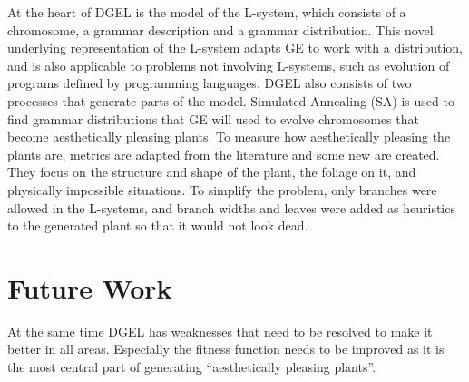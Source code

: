 At the heart of DGEL is the model of the L-system, which consists of a chromosome, a grammar description and a grammar distribution.
This novel underlying representation of the L-system adapts GE to work with a distribution, and is also applicable to problems not involving L-systems, such as evolution of programs defined by programming languages.
DGEL also consists of two processes that generate parts of the model.
Simulated Annealing (SA) is used to find grammar distributions that GE will used to evolve chromosomes that become aesthetically pleasing plants.
To measure how aesthetically pleasing the plants are, metrics are adapted from the literature and some new are created.
They focus on the structure and shape of the plant, the foliage on it, and physically impossible situations.
To simplify the problem, only branches were allowed in the L-systems, and branch widths and leaves were added as heuristics to the generated plant so that it would not look dead.


\section{Future Work}
At the same time DGEL has weaknesses that need to be resolved to make it better in all areas.
Especially the fitness function needs to be improved as it is the most central part of generating ``aesthetically pleasing plants''.
